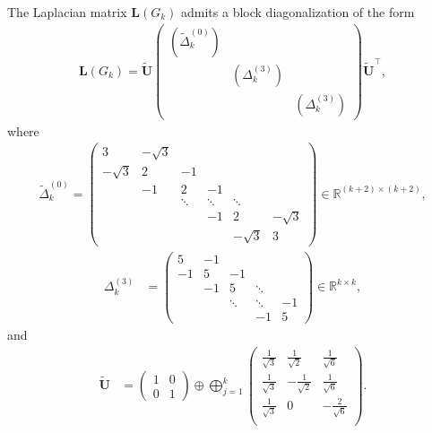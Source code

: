 \documentclass[10pt,a4paper]{amsart}
\begin{document}
\begin{lemma}\label{lem:block-diag}
    The Laplacian matrix $\mathbf{L}(G_k)$ admits a block diagonalization of the form
        \begin{align}\label{eq:lap-block-repn}
            \mathbf{L}(G_k) = \widetilde{\mathbf{U}} \begin{pmatrix}
            (\widetilde{\Delta}_k^{(0)}) & & \\
            & (\Delta_k^{(3)}) & \\
            & & (\Delta_k^{(3)})
        \end{pmatrix} \widetilde{\mathbf{U}}^\top,
        \end{align}
    where
        \begin{align*}
            \widetilde{\Delta}_k^{(0)}=
            \begin{pmatrix}
            3 & -\sqrt3 &        &        &        &   \\
            -\sqrt3 & 2 & -1     &        &        &    \\
                    & -1 & 2 & -1&        &        \\
                    &    & \ddots & \ddots & \ddots &   \\
                    &    &        & -1 & 2 & -\sqrt3 \\
                   &    &        &    & -\sqrt3 & 3
            \end{pmatrix}\in\mathbb{R}^{(k+2)\times (k+2)}, 
        \end{align*}
        \begin{align*}
            \Delta_k^{(3)} &= \begin{pmatrix}
            5 & -1 &        &        & \\
            -1& 5  & -1     &        &  \\
               &-1 & 5      & \ddots &  \\
               &   & \ddots & \ddots & -1\\
              &   &        & -1 & 5
            \end{pmatrix}\in\mathbb{R}^{k\times k},
        \end{align*}
    and 
        \begin{align*}
            \widetilde{\mathbf{U}} &= \begin{pmatrix}
                1 & 0\\
                0 & 1
            \end{pmatrix} \oplus \bigoplus_{j=1}^{k} \begin{pmatrix}
                \tfrac{1}{\sqrt{3}} & \tfrac{1}{\sqrt{2}}&\tfrac{1}{\sqrt{6}}\\
                \tfrac{1}{\sqrt{3}} & -\tfrac{1}{\sqrt{2}}& \tfrac{1}{\sqrt{6}}\\
                \tfrac{1}{\sqrt{3}} & 0 & -\tfrac{2}{\sqrt{6}}\\
            \end{pmatrix}.
        \end{align*}
\end{lemma}
\end{document}
